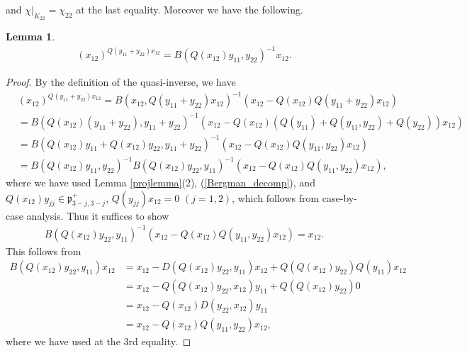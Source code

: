 \documentclass[pdftex]{sigma}
\numberwithin{equation}{section}
\newtheorem{Lemma}[Theorem]{Lemma}
\newcommand{\fp}{\mathfrak{p}}
\begin{document}
and $\chi|_{K_{22}}=\chi_{22}$ at the last equality. Moreover we have the following.
\begin{Lemma}
\begin{gather*} (x_{12})^{Q(y_{11}+y_{22})x_{12}}=B(Q(x_{12})y_{11},y_{22})^{-1}x_{12}. \end{gather*}
\end{Lemma}
\begin{proof}By the definition of the quasi-inverse, we have
\begin{align*}
&(x_{12})^{Q(y_{11}+y_{22})x_{12}}=B(x_{12},Q(y_{11}+y_{22})x_{12})^{-1}(x_{12}-Q(x_{12})Q(y_{11}+y_{22})x_{12})\\
&=B(Q(x_{12})(y_{11}+y_{22}),y_{11}+y_{22})^{-1}(x_{12}-Q(x_{12})(Q(y_{11})+Q(y_{11},y_{22})+Q(y_{22}))x_{12})\\
&=B(Q(x_{12})y_{11}+Q(x_{12})y_{22},y_{11}+y_{22})^{-1}(x_{12}-Q(x_{12})Q(y_{11},y_{22})x_{12})\\
&=B(Q(x_{12})y_{11},y_{22})^{-1}B(Q(x_{12})y_{22},y_{11})^{-1}(x_{12}-Q(x_{12})Q(y_{11},y_{22})x_{12}),
\end{align*}
where we have used Lemma \ref{projlemma}(2), (\ref{Bergman_decomp}),
and $Q(x_{12})y_{jj}\in\fp^+_{3-j,3-j}$, $Q(y_{jj})x_{12}=0$ $(j=1,2)$, which follows from case-by-case analysis.
Thus it suffices to show
\begin{gather*} B(Q(x_{12})y_{22},y_{11})^{-1}(x_{12}-Q(x_{12})Q(y_{11},y_{22})x_{12})=x_{12}. \end{gather*}
This follows from
\begin{align*}
B(Q(x_{12})y_{22},y_{11})x_{12}&=x_{12}-D(Q(x_{12})y_{22},y_{11})x_{12}+Q(Q(x_{12})y_{22})Q(y_{11})x_{12}\\
&=x_{12}-Q(Q(x_{12})y_{22},x_{12})y_{11}+Q(Q(x_{12})y_{22})0\\
&=x_{12}-Q(x_{12})D(y_{22},x_{12})y_{11}\\
& =x_{12}-Q(x_{12})Q(y_{11},y_{22})x_{12},
\end{align*}
where we have used \cite[Part V, Proposition I.2.1 (J3.1$'$)]{FKKLR} at the 3rd equality.
\end{proof}
\end{document}
